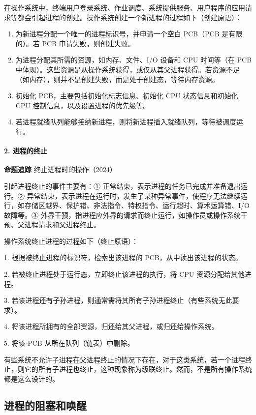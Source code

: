\documentclass{ctexbook}
\begin{document}
	在操作系统中，终端用户登录系统、作业调度、系统提供服务、用户程序的应用请求等都会引起进程的创建。操作系统创建一个新进程的过程如下（创建原语）：
	
	\begin{enumerate}
		\item 为新进程分配一个唯一的进程标识号，并申请一个空白 PCB（PCB 是有限的）。若 PCB 申请失败，则创建失败。
		\item 为进程分配其所需的资源，如内存、文件、I/O 设备和 CPU 时间等（在 PCB 中体现）。这些资源是从操作系统获得，或仅从其父进程获得。若资源不足（如内存），则并不是创建失败，而是处于创建态，等待内存资源。
		\item 初始化 PCB，主要包括初始化标志信息、初始化 CPU 状态信息和初始化 CPU 控制信息，以及设置进程的优先级等。
		\item 若进程就绪队列能够接纳新进程，则将新进程插入就绪队列，等待被调度运行。
	\end{enumerate}
	
	\paragraph{2. 进程的终止}
	
	\textbf{命题追踪} 终止进程时的操作（2024）
	
	引起进程终止的事件主要有：① 正常结束，表示进程的任务已完成并准备退出运行。② 异常结束，表示进程在运行时，发生了某种异常事件，使程序无法继续运行，如存储区越界、保护错、非法指令、特权指令、运行超时、算术运算错、I/O 故障等。③ 外界干预，指进程应外界的请求而终止运行，如操作员或操作系统干预、父进程请求和父进程终止。
	
	操作系统终止进程的过程如下（终止原语）：
	
	1. 根据被终止进程的标识符，检索出该进程的 PCB，从中读出该进程的状态。
	
	2. 若被终止进程处于运行态，立即终止该进程的执行，将 CPU 资源分配给其他进程。
	
	3. 若该进程还有子孙进程，则通常需将其所有子孙进程终止（有些系统无此要求）。
	
	4. 将该进程所拥有的全部资源，归还给其父进程，或归还给操作系统。
	
	5. 将该 PCB 从所在队列（链表）中删除。
	
	
	有些系统不允许子进程在父进程终止的情况下存在，对于这类系统，若一个进程终止，则它的所有子进程也终止，这种现象称为级联终止。然而，不是所有操作系统都是这么设计的。
	
	\subsection{进程的阻塞和唤醒}
	
\end{document}
